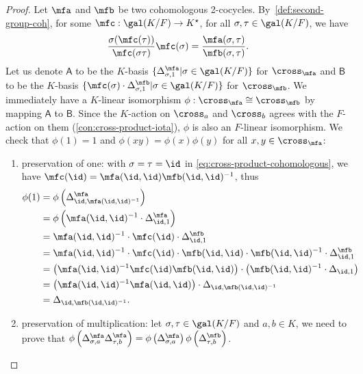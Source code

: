 \begin{proof}
  Let $\mfa$ and $\mfb$ be two cohomologous 2-cocycles. By~\cref{def:second-group-coh}, for some $\mfc: \gal(K/F) \to K^{\star}$, for all $\sigma, \tau\in\gal(K/F)$, we have
    \begin{equation}
      \label{eq:cross-product-cohomologous}
    \frac{\sigma(\mfc(\tau))}{\mfc(\sigma\tau)}\mfc(\sigma) = \frac{\mfa(\sigma, \tau)}{\mfb(\sigma, \tau)}.
    \end{equation}
    Let us denote $\mathsf{A}$ to be the $K$-basis $\{\Delta^{\mfa}_{\sigma, 1} | \sigma\in\gal(K/F)\}$ for $\cross_{\mfa}$ and $\mathsf{B}$ to be the $K$-basis $\{\mfc(\sigma)\cdot \Delta^{\mfb}_{\sigma, 1}|\sigma\in\gal(K/F)\}$ for $\cross_{\mfb}$. We immediately have a $K$-linear isomorphism $\phi : \cross_{\mfa}\cong \cross_{\mfb}$ by mapping $\mathsf{A}$ to $\mathsf{B}$. Since the $K$-action on $\cross_{a}$ and $\cross_{b}$ agrees with the $F$-action on them (\cref{con:cross-product-iota}), $\phi$ is also an $F$-linear isomorphism. We check that $\phi(1) = 1$ and $\phi(xy) = \phi(x)\phi(y)$ for all $x, y \in \cross_{\mfa}$:
    \begin{enumerate}
      \item preservation of one: with $\sigma = \tau =\id$ in \cref{eq:cross-product-cohomologous}, we have $\mfc(\id) = \mfa(\id,\id)\mfb(\id,\id)^{-1}$, thus
  \[
    \begin{aligned}
      \phi(1)
      &= \phi\left(\Delta^{\mfa}_{\id,\mfa(\id,\id)^{-1}}\right)\\
      &= \phi\left(
        \mfa(\id,\id)^{-1}\cdot \Delta^{\mfa}_{\id, 1}
        \right) \\
      &= \mfa(\id,\id)^{-1}\cdot \mfc(\id) \cdot \Delta^{\mfb}_{\id, 1} \\
      &= \mfa(\id,\id)^{-1}\cdot \mfc(\id)\cdot \mfb(\id,\id) \cdot \mfb(\id,\id)^{-1}\cdot \Delta^{\mfb}_{\id, 1} \\
      &= \left(
        \mfa(\id,\id)^{-1}\mfc(\id)\mfb(\id,\id)
        \right)\cdot
        \left(
        \mfb(\id,\id)^{-1}\cdot \Delta_{\id, 1}
        \right) \\
      &= \left(\mfa(\id,\id)^{-1}\mfa(\id,\id)\right)\cdot \Delta_{\id,\mfb(\id,\id)^{-1}} \\
      &= \Delta_{\id,\mfb(\id,\id)^{-1}}.
    \end{aligned}
  \]
      \item preservation of multiplication:
            let $\sigma,\tau\in\gal(K/F)$ and $a, b \in K$, we need to prove that $\phi\left(\Delta^{\mfa}_{\sigma, a}\Delta^{\mfa}_{\tau, b}\right) = \phi\left(\Delta^{\mfa}_{\sigma, a}\right)\phi\left(\Delta^{\mfb}_{\tau, b}\right)$.

\end{enumerate}
\end{proof}
